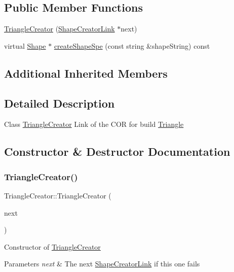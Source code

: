 \subsection*{Public Member Functions}
\begin{DoxyCompactItemize}
\item 
\hyperlink{class_triangle_creator_a89e29090c1f072d81562e448a98a138d}{Triangle\+Creator} (\hyperlink{class_shape_creator_link}{Shape\+Creator\+Link} $\ast$next)
\item 
virtual \hyperlink{class_shape}{Shape} $\ast$ \hyperlink{class_triangle_creator_a8698d657d98a7be93aeaf86b2434bbb3}{create\+Shape\+Spe} (const string \&shape\+String) const
\end{DoxyCompactItemize}
\subsection*{Additional Inherited Members}


\subsection{Detailed Description}
Class \hyperlink{class_triangle_creator}{Triangle\+Creator} Link of the C\+OR for build \hyperlink{class_triangle}{Triangle} 

\subsection{Constructor \& Destructor Documentation}
\hypertarget{class_triangle_creator_a89e29090c1f072d81562e448a98a138d}{}\label{class_triangle_creator_a89e29090c1f072d81562e448a98a138d} 
\subsubsection{\texorpdfstring{Triangle\+Creator()}{TriangleCreator()}}
{\footnotesize\ttfamily Triangle\+Creator\+::\+Triangle\+Creator (\begin{DoxyParamCaption}\item[{\hyperlink{class_shape_creator_link}{Shape\+Creator\+Link} $\ast$}]{next }\end{DoxyParamCaption})}

Constructor of \hyperlink{class_triangle_creator}{Triangle\+Creator} 
\begin{DoxyParams}{Parameters}
{\em next} & The next \hyperlink{class_shape_creator_link}{Shape\+Creator\+Link} if this one fails \\
\hline
\end{DoxyParams}


